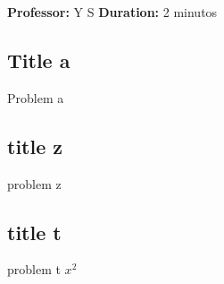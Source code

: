 \documentclass[11pt,addpoints]{exam}
\begin{document}
 
\textbf{Professor: }Y S \newline 
\textbf{Duration: }2 minutos \newline 
\begin{center} 
\end{center} 
\begin{questions} 
\question[6] 	\label{DisplayModeExample} 
\subsection*{Title a } 
Problem a 
\question[6] 	\label{DisplayModeExample} 
\subsection*{title z } 
problem z 
\question[7] 	\label{DisplayModeExample} 
\subsection*{title t } 
problem t
$x^2$ 
\end{questions} 
\end{document}
